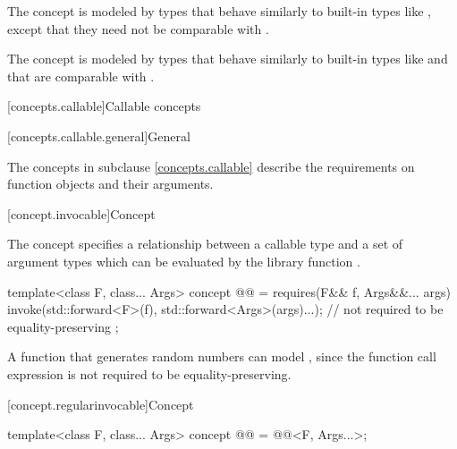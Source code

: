 \begin{itemdescr}
\pnum
\begin{note}
The  concept is modeled by types that behave similarly
to built-in types like , except that they need not
be comparable with \tcode{==}.
\end{note}

\pnum
\begin{note}
The  concept is modeled by types that behave similarly to
built-in types like  and that are comparable with
\tcode{==}.
\end{note}
\end{itemdescr}

[concepts.callable]{Callable concepts}

[concepts.callable.general]{General}

\pnum
The concepts in subclause \ref{concepts.callable} describe the requirements on function
objects and their arguments.

[concept.invocable]{Concept }

\pnum
The  concept specifies a relationship between a callable
type  and a set of argument types  which
can be evaluated by the library function .

\begin{itemdecl}
template<class F, class... Args>
  concept @@ = requires(F&& f, Args&&... args) {
    invoke(std::forward<F>(f), std::forward<Args>(args)...); // not required to be equality-preserving
  };
\end{itemdecl}

\begin{itemdescr}
\pnum
\begin{example}
A function that generates random numbers can model ,
since the  function call expression is not required to be
equality-preserving.
\end{example}
\end{itemdescr}

[concept.regularinvocable]{Concept }

\begin{itemdecl}
template<class F, class... Args>
  concept @@ = @@<F, Args...>;
\end{itemdecl}


